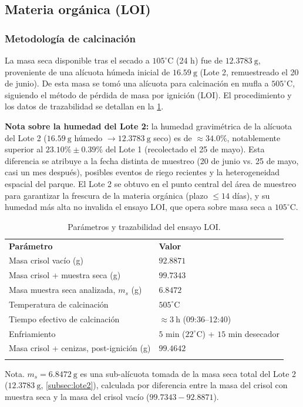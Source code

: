 \documentclass[fleqn]{jaes}
\begin{document}
\subsection{Materia orgánica (LOI)}\label{subsec:mo}

\subsubsection{Metodología de calcinación}

La masa seca disponible tras el secado a $105^\circ\text{C}$ (24 h) fue de $12.3783~\text{g}$, proveniente de una alícuota húmeda inicial de $16.59~\text{g}$ (Lote 2, remuestreado el 20 de junio). De esta masa se tomó una alícuota para calcinación en mufla a $505^\circ\text{C}$, siguiendo el método de pérdida de masa por ignición (LOI). El procedimiento y los datos de trazabilidad se detallan en la \cref{tab:loi_proceso}.

\textbf{Nota sobre la humedad del Lote 2:} la humedad gravimétrica de la alícuota del Lote 2 ($16.59~\text{g}$ húmedo $\to 12.3783~\text{g}$ seco) es de $\approx 34.0\%$, notablemente superior al $23.10\% \pm 0.39\%$ del Lote 1 (recolectado el 25 de mayo). Esta diferencia se atribuye a la fecha distinta de muestreo (20 de junio vs. 25 de mayo, casi un mes después), posibles eventos de riego recientes y la heterogeneidad espacial del parque. El Lote 2 se obtuvo en el punto central del área de muestreo para garantizar la frescura de la materia orgánica (plazo $\le 14$ días), y su humedad más alta no invalida el ensayo LOI, que opera sobre masa seca a $105^\circ\text{C}$.

\begin{table}[htbp]
\centering
\small
\caption{Parámetros y trazabilidad del ensayo LOI.}\label{tab:loi_proceso}
\begin{tabular}{@{}p{4.0cm}p{3.6cm}@{}}
\toprule
\textbf{Parámetro} & \textbf{Valor} \\
\colrule
Masa crisol vacío (g) & $92.8871$ \\
Masa crisol + muestra seca (g) & $99.7343$ \\
Masa muestra seca analizada, $m_s$ (g) & $6.8472$ \\
Temperatura de calcinación & $505^\circ\text{C}$ \\
Tiempo efectivo de calcinación & $\approx 3~\text{h}$ (09:36--12:40) \\
Enfriamiento & $5$ min ($22^\circ\text{C}$) + $15$ min desecador \\
Masa crisol + cenizas, post-ignición (g) & $99.4642$ \\
\botrule
\end{tabular}
\begin{tabnote}
Nota. $m_s = 6.8472~\text{g}$ es una sub-alícuota tomada de la masa seca total del Lote 2 ($12.3783~\text{g}$, \cref{subsec:lote2}), calculada por diferencia entre la masa del crisol con muestra seca y la masa del crisol vacío ($99.7343 - 92.8871$).
\end{tabnote}
\end{table}
\end{document}
